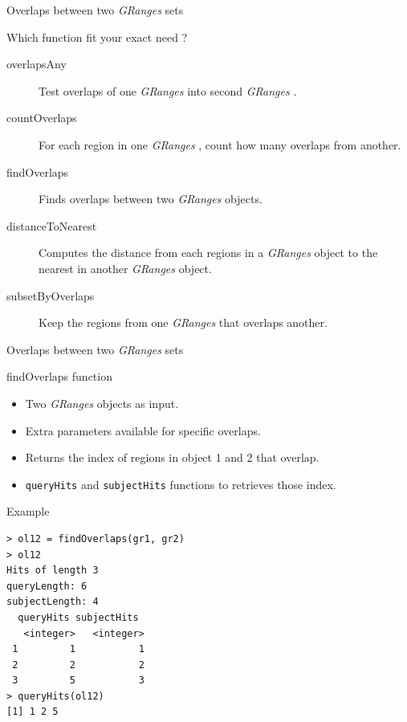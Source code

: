 \documentclass[10pt]{beamer}
\newcommand{\gr}{{\it GRanges} }
\begin{document}
\begin{frame}[fragile]{Overlaps between two {\it GRanges} sets}
  \begin{block}{Which function fit your exact need ?}
    \begin{description}
    \item[overlapsAny] Test overlaps of one \gr into second \gr.
      \medskip
    \item[countOverlaps] For each region in one \gr, count how many overlaps from another.
      \medskip
    \item[findOverlaps] Finds overlaps between two {\it GRanges} objects.
      \medskip
    \item[distanceToNearest] Computes the distance from each regions in a {\it GRanges} object to the nearest in another {\it GRanges} object.
      \medskip
    \item[subsetByOverlaps] Keep the regions from one \gr that overlaps another.
    \end{description}
  \end{block}
\end{frame}

\begin{frame}[fragile, shrink=10]{Overlaps between two {\it GRanges} sets}
  \begin{block}{{\sf findOverlaps} function}
    \begin{itemize}
    \item Two {\it GRanges} objects as input.
    \item Extra parameters available for specific overlaps.
    \item Returns the index of regions in object 1 and 2 that overlap.
    \item \verb!queryHits! and \verb!subjectHits! functions to retrieves those index.
    \end{itemize}
  \end{block}
  \begin{exampleblock}{Example}
\begin{lstlisting}
> ol12 = findOverlaps(gr1, gr2)
> ol12
Hits of length 3
queryLength: 6
subjectLength: 4
  queryHits subjectHits
   <integer>   <integer>
 1         1           1
 2         2           2
 3         5           3
> queryHits(ol12)
[1] 1 2 5
\end{lstlisting}
  \end{exampleblock}

\end{frame}
\end{document}
